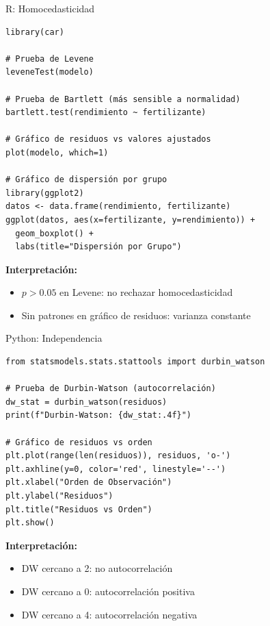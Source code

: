 \documentclass[aspectratio=169]{beamer}
\begin{document}
\begin{frame}[fragile]{R: Homocedasticidad}
\small
\begin{verbatim}
library(car)

# Prueba de Levene
leveneTest(modelo)

# Prueba de Bartlett (más sensible a normalidad)
bartlett.test(rendimiento ~ fertilizante)

# Gráfico de residuos vs valores ajustados
plot(modelo, which=1)

# Gráfico de dispersión por grupo
library(ggplot2)
datos <- data.frame(rendimiento, fertilizante)
ggplot(datos, aes(x=fertilizante, y=rendimiento)) +
  geom_boxplot() +
  labs(title="Dispersión por Grupo")
\end{verbatim}

\vspace{0.2cm}
\textbf{Interpretación:}
\begin{itemize}
\item $p > 0.05$ en Levene: no rechazar homocedasticidad
\item Sin patrones en gráfico de residuos: varianza constante
\end{itemize}
\end{frame}

\begin{frame}[fragile]{Python: Independencia}
\small
\begin{verbatim}
from statsmodels.stats.stattools import durbin_watson

# Prueba de Durbin-Watson (autocorrelación)
dw_stat = durbin_watson(residuos)
print(f"Durbin-Watson: {dw_stat:.4f}")

# Gráfico de residuos vs orden
plt.plot(range(len(residuos)), residuos, 'o-')
plt.axhline(y=0, color='red', linestyle='--')
plt.xlabel("Orden de Observación")
plt.ylabel("Residuos")
plt.title("Residuos vs Orden")
plt.show()
\end{verbatim}

\vspace{0.2cm}
\textbf{Interpretación:}
\begin{itemize}
\item DW cercano a 2: no autocorrelación
\item DW cercano a 0: autocorrelación positiva
\item DW cercano a 4: autocorrelación negativa
\end{itemize}
\end{frame}
\end{document}
